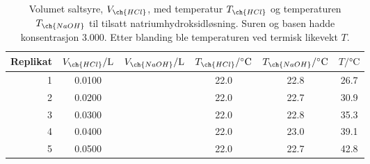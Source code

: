 	\begin{table}
		\centering
		\caption{Volumet saltsyre, $V_{\ch{HCl}}$, med temperatur $T_{\ch{HCl}}$ og temperaturen $T_{\ch{NaOH}}$ til tilsatt natriumhydroksidløsning.
				 Suren og basen hadde konsentrasjon \SI{3.000}{\molar}.
				 Etter blanding ble temperaturen ved termisk likevekt $T$.}
		\label{tbl:calexample2}
		\begin{tabular}{r S[table-format=1.4] S[table-format=1.4] S[table-format=2.1] S[table-format=2.1] S[table-format=2.1]}
			\toprule
			Replikat & $V_{\ch{HCl}}/\si{\litre}$ & $V_{\ch{NaOH}}/\si{\litre}$ & $T_{\ch{HCl}}/\si{\degreeCelsius}$ & $T_{\ch{NaOH}}/\si{\degreeCelsius}$ & $T/\si{\degreeCelsius}$ \\  &                     0.0100 &          &                               22.0 &                                22.8 &                    26.7 \\
			       2 &                     0.0200 &          &                               22.0 &                                22.7 &                    30.9 \\ 
			       3 &                     0.0300 &          &                               22.0 &                                22.8 &                    35.3 \\
			       4 &                     0.0400 &          &                               22.0 &                                23.0 &                    39.1 \\
			       5 &                     0.0500 &          &                               22.0 &                                22.7 &                    42.8 \\ \bottomrule 
		\end{tabular}                                                                                                                                                      
	\end{table}
	
